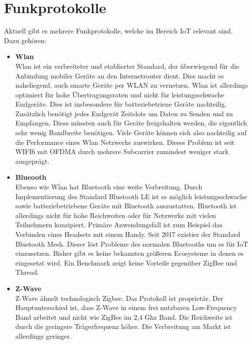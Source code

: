 \section{Funkprotokolle}
Aktuell gibt es mehrere Funkprotokolle, welche im Bereich IoT relevant sind. Dazu gehören:
\begin{itemize}
    \item \textbf{Wlan} \\
    Wlan ist ein verbreiteter und etablierter Standard, der überwiegend für die Anbindung mobiler Geräte an den
    Internetrouter dient. Dies macht es naheliegend, auch smarte Geräte per WLAN zu vernetzen. Wlan ist allerdings 
    optimiert für hohe Übertragungsraten und nicht für leistungsschwache Endgeräte. Dies ist
    insbesondere für batteriebetriene Geräte nachteilig. Zusätzlich benötigt jedes Endgerät Zeitslots um Daten zu Senden und zu Empfangen. Diese müssten auch für Geräte freigehalten werden, die eigentlich
    sehr wenig Bandbreite benötigen. Viele Geräte können sich also nachteilig auf die Performance eines Wlan Netzwerks auswirken. Dieses Problem ist seit WIFI6 mit OFDMA durch mehrere Subcarrier 
    zumindest weniger stark ausgeprägt.

    \item \textbf{Blueooth}\\
    Ebenso wie Wlan hat Bluetooth eine weite Verbreitung. Durch Implementierung 
    des Standard Bluetooth LE ist es möglich leistungsschwache sowie batteriebetriebene Geräte mit Bluetooth auszustatten. Bluetooth
    ist allerdings nicht für hohe Reichweiten oder für Netzwerke mit vielen Teilnehmern konzipiert. Primäre Anwendungsfall ist zum Beispiel das Verbinden eines Headsets mit 
    einem Handy. Seit 2017 existier der Standard \grqq Bluetooth Mesh\grqq. Dieser löst Probleme des normalen Bluetooths um es für IoT einzusetzen. Bisher gibt es keine bekannten
    größeren Ecosysteme in denen es eingesetzt wird. Ein Benchmark zeigt keine Vorteile gegenüber ZigBee und Thread. \cite{sila}

    \item \textbf{Z-Wave}\\
    Z-Wave \cite{zwave} ähnelt technologisch Zigbee. Das Protokoll ist proprietär. Der Hauptunterschied ist, dass Z-Wave in einem frei nutzbaren
    Low-Frequency Band arbeitet und nicht wie ZigBee im 2,4 Ghz Band. Die Reichweite ist durch die geringere Trägerfrequenz höher. Die Verbreitung am 
    Markt ist allerdings geringer.


\end{itemize}
